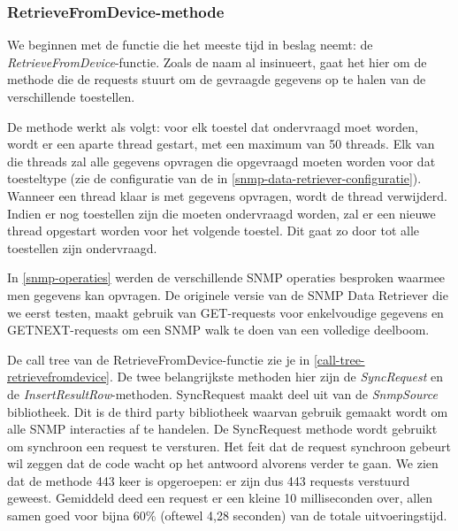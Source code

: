 \subsubsection{RetrieveFromDevice-methode}

We beginnen met de functie die het meeste tijd in beslag neemt: de \emph{RetrieveFromDevice}-functie.
Zoals de naam al insinueert, gaat het hier om de methode die de requests stuurt om de gevraagde gegevens op te halen van de verschillende toestellen.


De methode werkt als volgt: voor elk toestel dat ondervraagd moet worden,
wordt er een aparte thread gestart, met een maximum van 50 threads.
Elk van die threads zal alle gegevens opvragen die opgevraagd moeten worden voor dat toesteltype
(zie de configuratie van de \nwmretriever{} in \cref{snmp-data-retriever-configuratie}).
Wanneer een thread klaar is met gegevens opvragen, wordt de thread verwijderd.
Indien er nog toestellen zijn die moeten ondervraagd worden, zal er een nieuwe thread opgestart worden voor het volgende toestel.
Dit gaat zo door tot alle toestellen zijn ondervraagd.

In \cref{snmp-operaties} werden de verschillende SNMP operaties besproken waarmee men
gegevens kan opvragen. De originele versie van de SNMP Data Retriever die we eerst testen, maakt gebruik van
GET-requests voor enkelvoudige gegevens en GETNEXT-requests om een SNMP walk te doen van 
een volledige deelboom.

De call tree van de RetrieveFromDevice-functie zie je in \cref{call-tree-retrievefromdevice}.
De twee belangrijkste methoden hier zijn de \emph{SyncRequest} en de \emph{InsertResultRow}-methoden.
SyncRequest maakt deel uit van de \emph{SnmpSource} bibliotheek. %
Dit is de third party bibliotheek waarvan gebruik gemaakt wordt om alle SNMP interacties af te handelen. %
De SyncRequest methode wordt gebruikt om synchroon een request te versturen.
Het feit dat de request synchroon gebeurt wil zeggen dat de code wacht op het antwoord alvorens verder te gaan.
We zien dat de methode 443 keer is opgeroepen: er zijn dus 443 requests verstuurd geweest.
Gemiddeld deed een request er een kleine 10 milliseconden over, allen samen goed voor bijna 60\% (oftewel 4,28 seconden) van de totale uitvoeringstijd.


